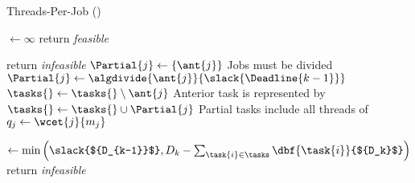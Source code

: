 \begin{algorithm}[ht]
  \caption{Threads-Per-Job (\tpj{})}\label{alg:tpj}
  \begin{algorithmic}[1]
    \State {} ${\gets \infty}$
     \label{line:begin-for}
       \label{line:infeasible-1}
        \State return \emph{feasible}
      \EndIf
 
            \label{line:bnc-mod-start}
      \label{line:minq-start}
        \State return \emph{infeasible} \label{line:no-slack-infease}
        \EndIf \label{line:minq-end}
      \State ${\Partial{j} \gets \{\ant{j}\}}$
      \label{line:rem-p1}
        \Comment Jobs must be divided
          \State ${\Partial{j} \gets \algdivide{\ant{j}}{\slack{\Deadline{k-1}}}}$
          \label{line:divide}
          \State ${\tasks{} \gets \tasks{} \setminus \ant{j}}$
          \Comment Anterior task  is represented by 
          \State ${\tasks{} \gets \tasks{} \cup \Partial{j}}$
          \Comment Partial tasks include all threads of 
      \EndIf \label{line:rem-p2}
          \State ${q_j \gets \wcet{j}{m_j}}$
      \EndFor
      \EndFor \label{line:the-same}
      \label{line:bnc-mod-end}
      
      \State {} ${\gets \min
        \left(
          \slack{${D_{k-1}}$}, D_k - \sum_{\task{i} \in \tasks}
          \dbf{\task{i}}{${D_k}$}
        \right)
      }$ \label{line:same-deadline}
       \label{line:infeasible-2}
        \State return \emph{infeasible} \label{line:more-demand}
      \EndIf
    \EndFor
  \end{algorithmic}
\end{algorithm}
